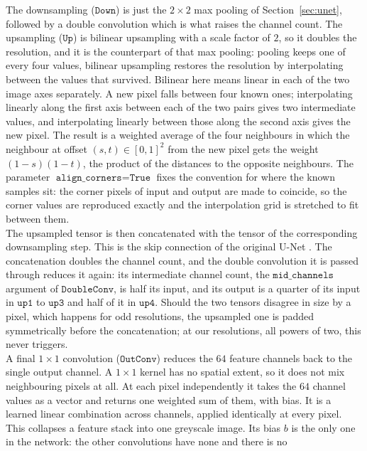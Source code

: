\documentclass{article}
\numberwithin{equation}{section}
\begin{document}
The downsampling ($\texttt{Down}$) is just the $2\times2$ max pooling of
Section~\ref{sec:unet}, followed by a double convolution which is what raises
the channel count. The upsampling ($\texttt{Up}$) is bilinear upsampling with a
scale factor of $2$, so it doubles the resolution, and it is the counterpart of
that max pooling: pooling keeps one of every four values, bilinear upsampling
restores the resolution by interpolating between the values that survived.
Bilinear here means linear in each of the two image axes separately. A new pixel
falls between four known ones; interpolating linearly along the first axis
between each of the two pairs gives two intermediate values, and interpolating
linearly between those along the second axis gives the new pixel. The result is
a weighted average of the four neighbours in which the neighbour at offset $(s,t)\in[0,1]^2$ from the
new pixel gets the weight $(1-s)(1-t)$, the product of the distances to the opposite neighbours. The
parameter $\texttt{align\_corners}=\texttt{True}$ fixes the convention for where
the known samples sit: the corner pixels of input and output are made to
coincide, so the corner values are reproduced exactly and the interpolation grid
is stretched to fit between them.\\
The upsampled tensor is then concatenated with the tensor of the corresponding
downsampling step. This is the skip connection of the original U-Net
\parencite{U-NET}. The concatenation doubles the channel count, and the double
convolution it is passed through reduces it again: its intermediate channel count, the
$\texttt{mid\_channels}$ argument of $\texttt{DoubleConv}$, is half its input, and its output is a quarter
of its input in $\texttt{up1}$ to $\texttt{up3}$ and half of it in $\texttt{up4}$. Should the two
tensors disagree in size by a pixel, which happens for odd resolutions, the
upsampled one is padded symmetrically before the concatenation; at our
resolutions, all powers of two, this never triggers.\\
A final $1\times1$ convolution ($\texttt{OutConv}$) reduces the $64$ feature
channels back to the single output channel. A $1\times1$ kernel has no spatial
extent, so it does not mix neighbouring pixels at all. At each pixel
independently it takes the $64$ channel values as a vector and returns one
weighted sum of them, with bias. It is a learned linear combination across
channels, applied identically at every pixel. This collapses a feature stack into one greyscale image.
Its bias $b$ is the only one in the network: the other convolutions have none and there is no
\end{document}
